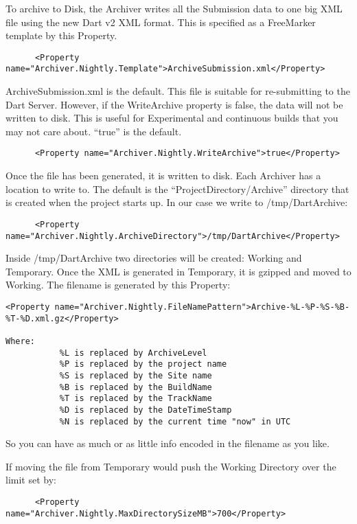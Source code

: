 \documentclass{InsightBook}
\begin{document}
To archive to Disk, the Archiver writes all the Submission data to one
big XML file using the new Dart v2 XML format.  This is specified as a
FreeMarker template by this Property.
\begin{verbatim}
      <Property name="Archiver.Nightly.Template">ArchiveSubmission.xml</Property>
\end{verbatim}

ArchiveSubmission.xml is the default.  This file is suitable for re-submitting to the Dart Server.  However, if the WriteArchive property is false, the data will not be written to disk.  This is useful for Experimental and continuous builds that you may not care about.  ``true'' is the default.
\begin{verbatim}
      <Property name="Archiver.Nightly.WriteArchive">true</Property>
\end{verbatim}

Once the file has been generated, it is written to disk.  Each Archiver has a location to write to.  The default is the ``ProjectDirectory/Archive'' directory that is created when the project starts up.  In our case we write to /tmp/DartArchive:
\begin{verbatim}
      <Property name="Archiver.Nightly.ArchiveDirectory">/tmp/DartArchive</Property>
\end{verbatim}

Inside /tmp/DartArchive two directories will be created: Working and Temporary.  Once the XML is generated in Temporary, it is gzipped and moved to Working.  The filename is generated by this Property:
\begin{verbatim}
<Property name="Archiver.Nightly.FileNamePattern">Archive-%L-%P-%S-%B-%T-%D.xml.gz</Property>

Where: 
           %L is replaced by ArchiveLevel
           %P is replaced by the project name
           %S is replaced by the Site name
           %B is replaced by the BuildName
           %T is replaced by the TrackName
           %D is replaced by the DateTimeStamp
           %N is replaced by the current time "now" in UTC
\end{verbatim}

So you can have as much or as little info encoded in the filename as you like.

If moving the file from Temporary would push the Working Directory over the limit set by:
\begin{verbatim}
      <Property name="Archiver.Nightly.MaxDirectorySizeMB">700</Property>
\end{verbatim}
\end{document}
